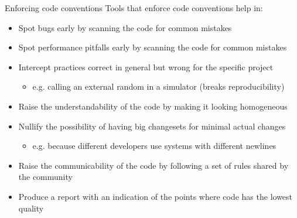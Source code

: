 \documentclass[presentation]{beamer}
\begin{document}
\begin{frame}[fragile]{Enforcing code conventions}
    Tools that enforce code conventions help in:
    \begin{itemize}
        \item Spot bugs early by scanning the code for common mistakes
        \item Spot performance pitfalls early by scanning the code for common mistakes
        \item Intercept practices correct in general but wrong for the specific project
        \begin{itemize}
            \item e.g. calling an external random in a simulator (breaks reproducibility)
        \end{itemize}
        \item Raise the understandability of the code by making it looking homogeneous
        \item Nullify the possibility of having big changesets for minimal actual changes
        \begin{itemize}
            \item e.g. because different developers use systems with different newlines
        \end{itemize}
        \item Raise the communicability of the code by following a set of rules shared by the community
        \item Produce a report with an indication of the points where code has the lowest quality
    \end{itemize}
\end{frame}
\end{document}
